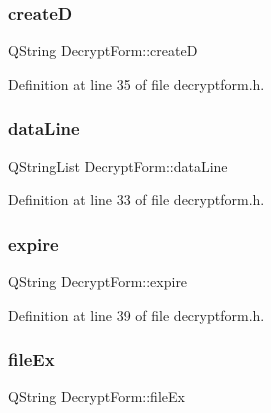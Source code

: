 \subsubsection{\texorpdfstring{createD}{createD}}
{\footnotesize\ttfamily Q\+String Decrypt\+Form\+::createD\hspace{0.3cm}{\ttfamily [protected]}}



Definition at line 35 of file decryptform.\+h.

\hypertarget{class_decrypt_form_a16c208fef98e40521b962932602ce0ff}{}\label{class_decrypt_form_a16c208fef98e40521b962932602ce0ff} 
\subsubsection{\texorpdfstring{data\+Line}{dataLine}}
{\footnotesize\ttfamily Q\+String\+List Decrypt\+Form\+::data\+Line\hspace{0.3cm}{\ttfamily [protected]}}



Definition at line 33 of file decryptform.\+h.

\hypertarget{class_decrypt_form_ac0a3281de07c0e2b461652ce12b1ada2}{}\label{class_decrypt_form_ac0a3281de07c0e2b461652ce12b1ada2} 
\subsubsection{\texorpdfstring{expire}{expire}}
{\footnotesize\ttfamily Q\+String Decrypt\+Form\+::expire\hspace{0.3cm}{\ttfamily [protected]}}



Definition at line 39 of file decryptform.\+h.

\hypertarget{class_decrypt_form_a948100789ce9a1613fc4e028609d7f7d}{}\label{class_decrypt_form_a948100789ce9a1613fc4e028609d7f7d} 
\subsubsection{\texorpdfstring{file\+Ex}{fileEx}}
{\footnotesize\ttfamily Q\+String Decrypt\+Form\+::file\+Ex\hspace{0.3cm}{\ttfamily [protected]}}



